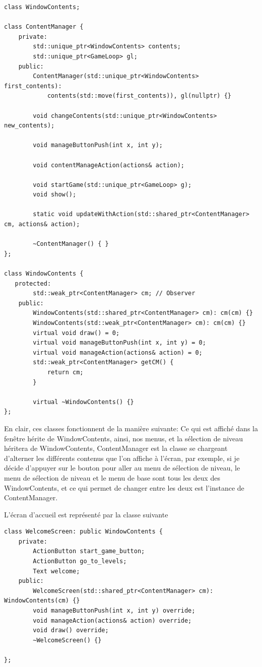 \documentclass[a4paper, 12pt]{article}
\begin{document}
\begin{lstlisting}
class WindowContents;

class ContentManager {
    private:
        std::unique_ptr<WindowContents> contents;
        std::unique_ptr<GameLoop> gl;
    public:
        ContentManager(std::unique_ptr<WindowContents> first_contents):
            contents(std::move(first_contents)), gl(nullptr) {}

        void changeContents(std::unique_ptr<WindowContents> new_contents);

        void manageButtonPush(int x, int y);

        void contentManageAction(actions& action);

        void startGame(std::unique_ptr<GameLoop> g);
        void show();

        static void updateWithAction(std::shared_ptr<ContentManager> cm, actions& action);

        ~ContentManager() { }
};

class WindowContents {
   protected:
        std::weak_ptr<ContentManager> cm; // Observer
    public:
        WindowContents(std::shared_ptr<ContentManager> cm): cm(cm) {}
        WindowContents(std::weak_ptr<ContentManager> cm): cm(cm) {}
        virtual void draw() = 0;
        virtual void manageButtonPush(int x, int y) = 0;
        virtual void manageAction(actions& action) = 0;
        std::weak_ptr<ContentManager> getCM() {
            return cm;
        }

        virtual ~WindowContents() {}
};
\end{lstlisting}
En clair, ces classes fonctionnent de la manière suivante:
Ce qui est affiché dans la fenêtre hérite de WindowContents, ainsi, nos menus, et la sélection de niveau héritera de WindowContents, ContentManager est la classe se chargeant d'alterner les différents contenus que l'on affiche à l'écran,
par exemple, si je décide d'appuyer sur le bouton pour aller au menu de sélection de niveau, le menu de sélection de niveau et le menu de base sont tous les deux des WindowContents, et ce qui permet de changer entre les deux est l'instance de ContentManager.

L'écran d'accueil est représenté par la classe suivante
\begin{lstlisting}
class WelcomeScreen: public WindowContents {
    private:
        ActionButton start_game_button;
        ActionButton go_to_levels;
        Text welcome;
    public:
        WelcomeScreen(std::shared_ptr<ContentManager> cm): WindowContents(cm) {}
        void manageButtonPush(int x, int y) override;
        void manageAction(actions& action) override;
        void draw() override;
        ~WelcomeScreen() {}

};
\end{lstlisting}
\end{document}
